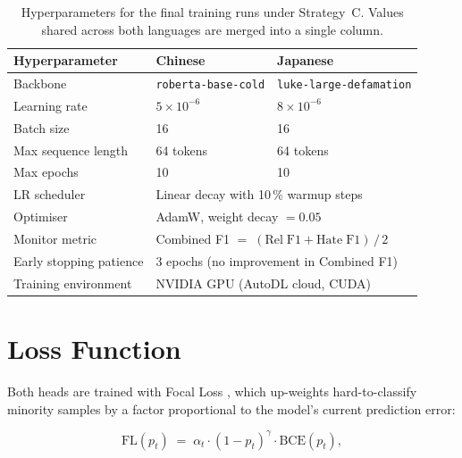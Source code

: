 \documentclass[../CLthesis.tex]{subfiles}
\begin{document}
\begin{table}[htbp]
\centering
\small
\begin{tabular}{@{}lll@{}}
\toprule
Hyperparameter              & Chinese                         & Japanese \\
\midrule
Backbone                    & \texttt{roberta-base-cold}       & \texttt{luke-large-defamation} \\
Learning rate               & $5 \times 10^{-6}$              & $8 \times 10^{-6}$ \\
Batch size                  & 16                              & 16 \\
Max sequence length         & 64 tokens                       & 64 tokens \\
Max epochs                  & 10                              & 10 \\
LR scheduler                & \multicolumn{2}{l}{Linear decay with 10\,\% warmup steps} \\
Optimiser                   & \multicolumn{2}{l}{AdamW, weight decay $= 0.05$} \\
Monitor metric              & \multicolumn{2}{l}{Combined F1 $=\;(\mathrm{Rel\;F1} + \mathrm{Hate\;F1})\,/\,2$} \\
Early stopping patience     & \multicolumn{2}{l}{3 epochs (no improvement in Combined F1)} \\
Training environment        & \multicolumn{2}{l}{NVIDIA GPU (AutoDL cloud, CUDA)} \\
\bottomrule
\end{tabular}
\caption{Hyperparameters for the final training runs under Strategy~C. Values shared across both languages are merged into a single column.}
\label{tab:hyperparams}
\end{table}


\section{Loss Function}
\label{sec:app-loss}

Both heads are trained with Focal Loss \citep{lin2018focallossdenseobject}, which up-weights hard-to-classify minority samples by a factor proportional to the model's current prediction error:

\begin{equation}
  \mathrm{FL}(p_t) \;=\; \alpha_t \cdot (1 - p_t)^{\gamma} \cdot \mathrm{BCE}(p_t),
  \label{eq:focal}
\end{equation}
\end{document}
